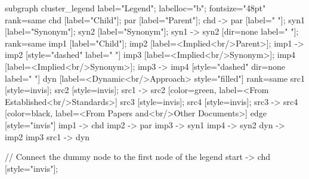\documentclass{article}
\begin{document}
{subgraph cluster_legend {
    label="Legend";
    labelloc="b";
    fontsize="48pt"
    {
        rank=same
        chd [label="Child"];
        par [label="Parent"];
        chd -> par [label="                "];
        syn1 [label="Synonym"];
        syn2 [label="Synonym"];
        syn1 -> syn2 [dir=none label="                "];
    }
    {
        rank=same
        imp1 [label="Child"];
        imp2 [label=<Implied<br/>Parent>];
        imp1 -> imp2 [style="dashed" label="                "]
        imp3 [label=<Implied<br/>Synonym>];
        imp4 [label=<Implied<br/>Synonym>];
        imp3 -> imp4 [style="dashed" dir=none label="                "]
    }
        dyn [label=<Dynamic<br/>Approach> style="filled"]
{
rank=same
src1 [style=invis];
src2 [style=invis];
src1 -> src2 [color=green, label=<From Established<br/>Standards>]
src3 [style=invis];
src4 [style=invis];
src3 -> src4 [color=black, label=<From Papers and<br/>Other Documents>]
}
    edge [style="invis"]
    imp1 -> chd
    imp2 -> par
    imp3 -> syn1
    imp4 -> syn2
dyn -> { imp2 imp3 }
src1 -> dyn
}

// Connect the dummy node to the first node of the legend
start -> chd [style="invis"];
}
\end{document}
